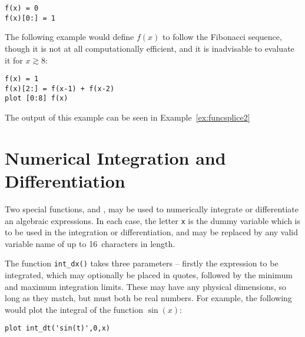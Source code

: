 \begin{verbatim}
f(x) = 0
f(x)[0:] = 1
\end{verbatim}

\noindent The following example would define $f(x)$ to follow the Fibonacci
sequence, though it is not at all computationally efficient, and it is
inadvisable to evaluate it for $x\gtrsim8$:

\begin{verbatim}
f(x) = 1
f(x)[2:] = f(x-1) + f(x-2)
plot [0:8] f(x)
\end{verbatim}


\noindent The output of this example can be seen in Example~\ref{ex:funcsplice2}

\section{Numerical Integration and Differentiation}

 Two special functions,
 and , may be used to numerically
integrate or differentiate an algebraic expressions.  In each case, the letter
{\tt x} is the dummy variable which is to be used in the integration or
differentiation, and may be replaced by any valid variable name of up to
16~characters in length.

The function {\tt int\_dx()} takes three parameters -- firstly the expression
to be integrated, which may optionally be placed in quotes, followed by the
minimum and maximum integration limits. These may have any physical dimensions,
so long as they match, but must both be real numbers. For example, the
following would plot the integral of the function $\sin(x)$:

\begin{verbatim}
plot int_dt('sin(t)',0,x)
\end{verbatim} 

